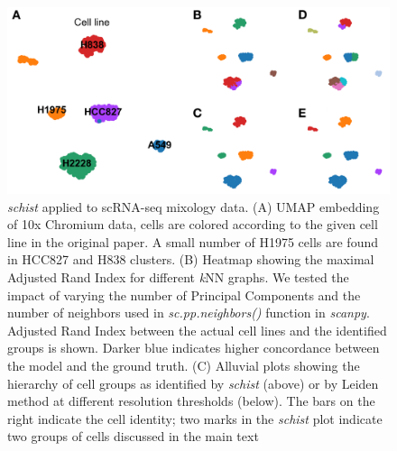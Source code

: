 \documentclass[10pt]{article}
\begin{document}
\begin{figure}[H]
\centering
\includegraphics[keepaspectratio,width=\textwidth,width=0.5\textheight]{FigureTian.png}
\caption[]{\emph{schist} applied to scRNA-seq mixology data. (A) UMAP embedding of 10x Chromium data, cells are colored according to the given cell line in the original paper. A small number of H1975 cells are found in HCC827 and H838 clusters. (B) Heatmap showing the maximal Adjusted Rand Index for different \emph{k}NN graphs. We tested the impact of varying the number of Principal Components and the number of neighbors used in \emph{sc.pp.neighbors()} function in \emph{scanpy}. Adjusted Rand Index between the actual cell lines and the identified groups is shown. Darker blue indicates higher concordance between the model and the ground truth. (C) Alluvial plots showing the hierarchy of cell groups as identified by \emph{schist} (above) or by Leiden method at different resolution thresholds (below). The bars on the right indicate the cell identity; two marks in the \emph{schist} plot indicate two groups of cells discussed in the main text}\label{FigureTian}
\end{figure}

\end{document}
